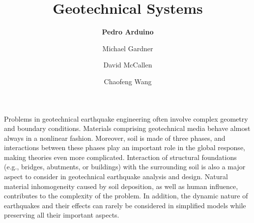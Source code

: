%
%
%


%
%
%
%
%
%
%
%

\title{Geotechnical Systems}
\author{
    \textbf{Pedro Arduino}
    \and Michael Gardner
    \and David McCallen
    \and Chaofeng Wang}
\tocauthor{}
%
%
\maketitle
\label{chapter:res_geotech}

Problems in geotechnical earthquake engineering often involve complex geometry and boundary conditions. Materials comprising geotechnical media behave almost always in a nonlinear fashion. Moreover, soil is made of three phases, and interactions between these phases play an important role in the global response, making theories even more complicated. Interaction of structural foundations (e.g., bridges, abutments, or buildings) with the surrounding soil is also a major aspect to consider in geotechnical earthquake analysis and design. Natural material inhomogeneity caused by soil deposition, as well as human influence, contributes to the complexity of the problem. In addition, the dynamic nature of earthquakes and their effects can rarely be considered in simplified models while preserving all their important aspects.

